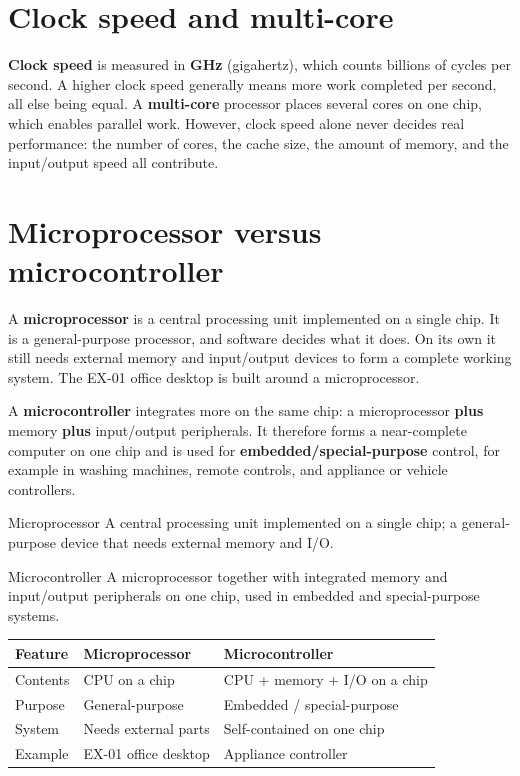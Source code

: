 \section{Clock speed and multi-core}
\textbf{Clock speed} is measured in \textbf{GHz} (gigahertz), which counts
billions of cycles per second. A higher clock speed generally means more work
completed per second, all else being equal. A \textbf{multi-core} processor
places several cores on one chip, which enables parallel work. However, clock
speed alone never decides real performance: the number of cores, the cache
size, the amount of memory, and the input/output speed all contribute.

\section{Microprocessor versus microcontroller}
A \textbf{microprocessor} is a central processing unit implemented on a single
chip. It is a general-purpose processor, and software decides what it does.
On its own it still needs external memory and input/output devices to form a
complete working system. The EX-01 office desktop is built around a
microprocessor.

A \textbf{microcontroller} integrates more on the same chip: a microprocessor
\textbf{plus} memory \textbf{plus} input/output peripherals. It therefore
forms a near-complete computer on one chip and is used for
\textbf{embedded/special-purpose} control, for example in washing machines,
remote controls, and appliance or vehicle controllers.

\begin{definitionbox}{Microprocessor}
A central processing unit implemented on a single chip; a general-purpose
device that needs external memory and I/O.
\end{definitionbox}

\begin{definitionbox}{Microcontroller}
A microprocessor together with integrated memory and input/output peripherals
on one chip, used in embedded and special-purpose systems.
\end{definitionbox}

\begin{center}
\begin{tabular}{p{}p{}p{}}
\toprule
\textbf{Feature} & \textbf{Microprocessor} & \textbf{Microcontroller}\\
\midrule
Contents & CPU on a chip & CPU + memory + I/O on a chip\\
Purpose & General-purpose & Embedded / special-purpose\\
System & Needs external parts & Self-contained on one chip\\
Example & EX-01 office desktop & Appliance controller\\
\bottomrule
\end{tabular}
\end{center}


